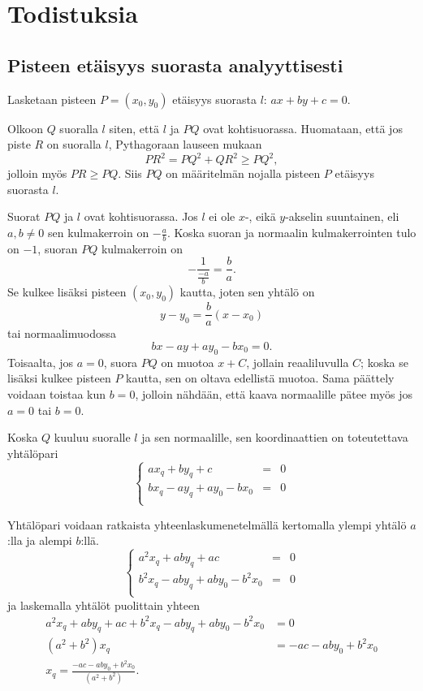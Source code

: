 \section{Todistuksia}

\subsection*{Pisteen etäisyys suorasta analyyttisesti}

Lasketaan pisteen $P = (x_0, y_0)$ etäisyys suorasta $l$: $ax+by+c=0$.

Olkoon $Q$ suoralla $l$ siten, että $l$ ja $PQ$ ovat kohtisuorassa. Huomataan, että jos piste $R$ on suoralla $l$, Pythagoraan lauseen mukaan
\[
PR^2 = PQ^2+QR^2 \geq PQ^2,
\]
jolloin myös $PR \geq PQ$. Siis $PQ$ on määritelmän nojalla pisteen $P$ etäisyys suorasta $l$.

Suorat $PQ$ ja $l$ ovat kohtisuorassa. Jos $l$ ei ole $x$-, eikä $y$-akselin suuntainen, eli $a,b \neq 0$ sen kulmakerroin on $-\frac{a}{b}$. Koska suoran ja normaalin kulmakerrointen tulo on $-1$, suoran $PQ$ kulmakerroin on
\[
-\frac{1}{\frac{-a}{b}} = \frac{b}{a}.
\]
Se kulkee lisäksi pisteen $(x_0,y_0)$ kautta, joten sen yhtälö on
\[
y-y_0 = \frac{b}{a}(x-x_0)
\]
tai normaalimuodossa
\[
bx-ay+ay_0-bx_0 = 0.
\]
Toisaalta, jos $a = 0$, suora $PQ$ on muotoa $x+C$, jollain reaaliluvulla $C$; koska se lisäksi kulkee pisteen $P$ kautta, sen on oltava edellistä muotoa. Sama päättely voidaan toistaa kun $b = 0$, jolloin nähdään, että kaava normaalille pätee myös jos $a = 0$ tai $b = 0$.

Koska $Q$ kuuluu suoralle $l$ ja sen normaalille, sen koordinaattien on toteutettava yhtälöpari
\[
\left\{    
    \begin{array}{rcl}
        ax_q + by_q + c &=&0 \\
        bx_q-ay_q+ay_0-bx_0 &=& 0 \\
    \end{array}
    \right.
\]

Yhtälöpari voidaan ratkaista yhteenlaskumenetelmällä kertomalla ylempi yhtälö $a$:lla ja alempi $b$:llä.
\[
\left\{    
    \begin{array}{rcl}
        a^2x_q + aby_q + ac &=&0 \\
        b^2x_q-aby_q+aby_0-b^2x_0 &=& 0 \\
    \end{array}
    \right.
\]
ja laskemalla yhtälöt puolittain yhteen
\begin{align*}
 a^2x_q + aby_q + ac + b^2x_q-aby_q+aby_0-b^2x_0 &= 0 \\
 (a^2+b^2)x_q &= -ac-aby_0+b^2x_0 \\
 x_q = \frac{-ac-aby_0+b^2x_0}{(a^2+b^2)}.
\end{align*}


